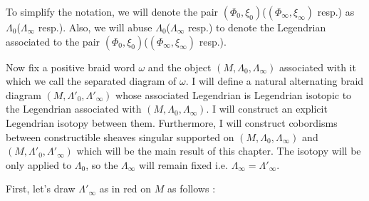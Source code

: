 To simplify the notation, we will denote the pair $(\Phi_0,\xi_0)$($(\Phi_\infty,\xi_\infty)$ resp.) as $\Lambda_0$($\Lambda_\infty$ resp.). Also, we will abuse $\Lambda_0$($\Lambda_\infty$ resp.) to denote the Legendrian associated to the pair $(\Phi_0,\xi_0)$($(\Phi_\infty,\xi_\infty)$ resp.).

Now fix a positive braid word $\omega$ and the object $(M,\Lambda_0,\Lambda_\infty)$ associated with it which we call the separated diagram of $\omega$. I will define a natural alternating braid diagram $(M,\Lambda'_0,\Lambda'_\infty)$ whose associated Legendrian is Legendrian isotopic to the Legendrian associated with $(M,\Lambda_0,\Lambda_\infty)$. I will construct an explicit Legendrian isotopy between them. Furthermore, I will construct cobordisms between constructible sheaves singular supported on $(M,\Lambda_0,\Lambda_\infty)$ and $(M,\Lambda'_0,\Lambda'_\infty)$ which will be the main result of this chapter. The isotopy will be only applied to $\Lambda_0$, so the $\Lambda_\infty$ will remain fixed i.e. $\Lambda_\infty = \Lambda'_\infty$.

First, let's draw $\Lambda'_\infty$ as in red on $M$ as follows :

